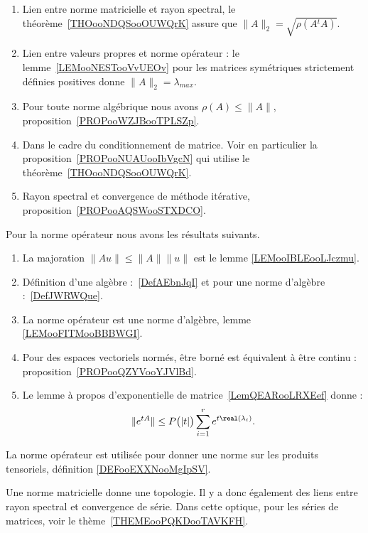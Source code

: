     \begin{enumerate}
        \item
            Lien entre norme matricielle et rayon spectral, le théorème~\ref{THOooNDQSooOUWQrK} assure que $\|A\|_2=\sqrt{\rho(A{^t}A)}$.
        \item
            Lien entre valeurs propres et norme opérateur : le lemme~\ref{LEMooNESTooVvUEOv} pour les matrices symétriques strictement définies positives donne \( \| A \|_2=\lambda_{max}\).
        \item
            Pour toute norme algébrique nous avons \( \rho(A)\leq \| A \|\), proposition~\ref{PROPooWZJBooTPLSZp}.
        \item
            Dans le cadre du conditionnement de matrice. Voir en particulier la proposition~\ref{PROPooNUAUooIbVgcN} qui utilise le théorème~\ref{THOooNDQSooOUWQrK}.
        \item
            Rayon spectral et convergence de méthode itérative, proposition~\ref{PROPooAQSWooSTXDCO}.
    \end{enumerate}

    Pour la norme opérateur nous avons les résultats suivants.

    \begin{enumerate}
        \item
            La majoration \( \| Au \|\leq \| A \|\| u \|\) est le lemme \ref{LEMooIBLEooLJczmu}.
        \item
            Définition d'une algèbre :~\ref{DefAEbnJqI} et pour une norme d'algèbre :~\ref{DefJWRWQue}.
        \item
            La norme opérateur est une norme d'algèbre, lemme \ref{LEMooFITMooBBBWGI}.
        \item
            Pour des espaces vectoriels normés, être borné est équivalent à être continu : proposition~\ref{PROPooQZYVooYJVlBd}.
        \item
            Le lemme à propos d'exponentielle de matrice~\ref{LemQEARooLRXEef} donne :
            \begin{equation*}
                \|  e^{tA} \|\leq P\big( | t | \big)\sum_{i=1}^r e^{t\real(\lambda_i)}.
            \end{equation*}
    \end{enumerate}

    La norme opérateur est utilisée pour donner une norme sur les produits tensoriels, définition \ref{DEFooEXXNooMgIpSV}.

    Une norme matricielle donne une topologie. Il y a donc également des liens entre rayon spectral et convergence de série. Dans cette optique, pour les séries de matrices, voir le thème~\ref{THEMEooPQKDooTAVKFH}.


